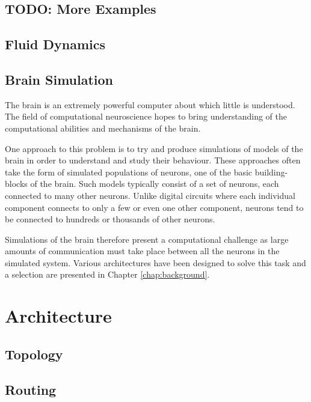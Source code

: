 \documentclass[a4paper,12pt,titlepage]{report}
\begin{document}
			\subsection{TODO: More Examples}
			
			\subsection{Fluid Dynamics}
			
			\subsection{Brain Simulation}
				
				
				The brain is an extremely powerful computer about which little is
				understood. The field of computational neuroscience hopes to bring
				understanding of the computational abilities and mechanisms of the
				brain.
				
				One approach to this problem is to try and produce simulations of models
				of the brain in order to understand and study their behaviour. These
				approaches often take the form of simulated populations of neurons, one
				of the basic building-blocks of the brain. Such models typically consist
				of a set of neurons, each connected to many other neurons.  Unlike
				digital circuits where each individual component connects to only a few
				or even one other component, neurons tend to be connected to hundreds or
				thousands of other neurons.
				
				Simulations of the brain therefore present a computational challenge as
				large amounts of communication must take place between all the neurons
				in the simulated system. Various architectures have been designed to
				solve this task and a selection are presented in Chapter
				\ref{chap:background}.
		
		\section{Architecture}
			
			\subsection{Topology}
			
			\subsection{Routing}
			
\end{document}

